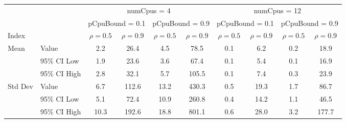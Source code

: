 \begin{tabular}{llc|c|c|c|c|c|c|c}
\toprule
& & \multicolumn{4}{c|}{numCpus = 4} & \multicolumn{4}{c}{numCpus = 12} \\
& & \multicolumn{2}{c|}{pCpuBound = 0.1} & \multicolumn{2}{c|}{pCpuBound = 0.9} & \multicolumn{2}{c|}{pCpuBound = 0.1} & \multicolumn{2}{c}{pCpuBound = 0.9} \\
Index & & $\rho = 0.5$ & $\rho = 0.9$ & $\rho = 0.5$ & $\rho = 0.9$ & $\rho = 0.5$ & $\rho = 0.9$ & $\rho = 0.5$ & $\rho = 0.9$ \\
\midrule
\multirow{3}{*}{Mean} & Value & 2.2 & 26.4 & 4.5 & 78.5 & 0.1 & 6.2 & 0.2 & 18.9 \\
 & 95\% CI Low & 1.9 & 23.6 & 3.6 & 67.4 & 0.1 & 5.4 & 0.1 & 16.9 \\
 & 95\% CI High & 2.8 & 32.1 & 5.7 & 105.5 & 0.1 & 7.4 & 0.3 & 23.9 \\
 \midrule
 \multirow{3}{*}{Std Dev} & Value & 6.7 & 112.6 & 13.2 & 430.3 & 0.5 & 19.3 & 1.7 & 86.7 \\
 & 95\% CI Low & 5.1 & 72.4 & 10.9 & 260.8 & 0.4 & 14.2 & 1.1 & 46.5 \\
 & 95\% CI High & 10.3 & 192.6 & 18.8 & 801.1 & 0.6 & 28.0 & 3.2 & 177.7 \\
\bottomrule
\end{tabular}